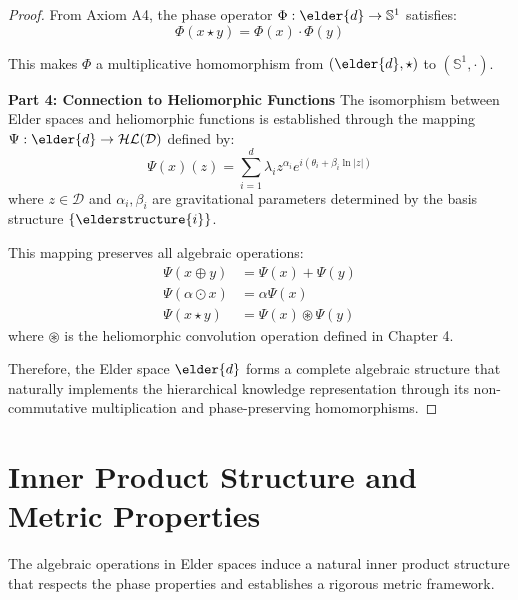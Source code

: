 \begin{proof}
From Axiom A4, the phase operator $\Phi: \elder{d} \rightarrow \mathbb{S}^1$ satisfies:
\begin{equation}
\Phi(x \star y) = \Phi(x) \cdot \Phi(y)
\end{equation}

This makes $\Phi$ a multiplicative homomorphism from $(\elder{d}, \star)$ to $(\mathbb{S}^1, \cdot)$.

\textbf{Part 4: Connection to Heliomorphic Functions}
The isomorphism between Elder spaces and heliomorphic functions is established through the mapping $\Psi: \elder{d} \rightarrow \mathcal{HL}(\mathcal{D})$ defined by:
\begin{equation}
\Psi(x)(z) = \sum_{i=1}^{d} \lambda_i z^{\alpha_i} e^{i(\theta_i + \beta_i \ln|z|)}
\end{equation}
where $z \in \mathcal{D}$ and $\alpha_i, \beta_i$ are gravitational parameters determined by the basis structure $\{\elderstructure{i}\}$.

This mapping preserves all algebraic operations:
\begin{align}
\Psi(x \oplus y) &= \Psi(x) + \Psi(y) \\
\Psi(\alpha \odot x) &= \alpha \Psi(x) \\
\Psi(x \star y) &= \Psi(x) \circledast \Psi(y)
\end{align}
where $\circledast$ is the heliomorphic convolution operation defined in Chapter 4.

Therefore, the Elder space $\elder{d}$ forms a complete algebraic structure that naturally implements the hierarchical knowledge representation through its non-commutative multiplication and phase-preserving homomorphisms.
\end{proof}

\section{Inner Product Structure and Metric Properties}

The algebraic operations in Elder spaces induce a natural inner product structure that respects the phase properties and establishes a rigorous metric framework.

